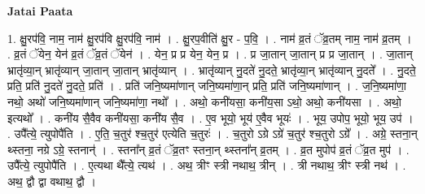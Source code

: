 \documentclass[17pt]{extarticle}
\begin{document}
\textbf{Jatai Paata} \newline

1. क्षु॒रप॑वि॒ नाम॒ नाम॑ क्षु॒रप॑वि क्षु॒रप॑वि॒ नाम॑ । . क्षु॒रप॒वीति॑ क्षु॒र - प॒वि॒ । . नाम॑ व्र॒तं ॅव्र॒तम् नाम॒ नाम॑ व्र॒तम् । . व्र॒तं ॅयेन॒ येन॑ व्र॒तं ॅव्र॒तं ॅयेन॑ । . येन॒ प्र प्र येन॒ येन॒ प्र । . प्र जा॒तान् जा॒तान् प्र प्र जा॒तान् । . जा॒तान् भ्रातृ॑व्या॒न् भ्रातृ॑व्यान् जा॒तान् जा॒तान् भ्रातृ॑व्यान् । . भ्रातृ॑व्यान् नु॒दते॑ नु॒दते॒ भ्रातृ॑व्या॒न् भ्रातृ॑व्यान् नु॒दते᳚ । . नु॒दते॒ प्रति॒ प्रति॑ नु॒दते॑ नु॒दते॒ प्रति॑ । . प्रति॑ जनि॒ष्यमा॑णान् जनि॒ष्यमा॑णा॒न् प्रति॒ प्रति॑ जनि॒ष्यमा॑णान् । . ज॒नि॒ष्यमा॑णा॒ नथो॒ अथो॑ जनि॒ष्यमा॑णान् जनि॒ष्यमा॑णा॒ नथो᳚ । . अथो॒ कनी॑यसा॒ कनी॑य॒सा ऽथो॒ अथो॒ कनी॑यसा । . अथो॒ इत्यथो᳚ । . कनी॑य सै॒वैव कनी॑यसा॒ कनी॑य सै॒व । . ए॒व भूयो॒ भूय॑ ए॒वैव भूयः॑ । . भूय॒ उपोप॒ भूयो॒ भूय॒ उप॑ । . उपै᳚त्ये॒ त्युपोपै॑ति । . ए॒ति॒ च॒तुर॑ श्च॒तुर॑ एत्येति च॒तुरः॑ । . च॒तुरो ऽग्रे ऽग्रे॑ च॒तुर॑ श्च॒तुरो ऽग्रे᳚ । . अग्रे॒ स्तना॒न् थ्स्तना॒ नग्रे ऽग्रे॒ स्तनान्॑ । . स्तना᳚न् व्र॒तं ॅव्र॒तꣳ स्तना॒न् थ्स्तना᳚न् व्र॒तम् । . व्र॒त मुपोप॑ व्र॒तं ॅव्र॒त मुप॑ । . उपै᳚त्ये॒ त्युपोपै॑ति । . ए॒त्यथा थै᳚त्ये॒ त्यथ॑ । . अथ॒ त्रीꣳ स्त्री नथाथ॒ त्रीन् । . त्री नथाथ॒ त्रीꣳ स्त्री नथ॑ । . अथ॒ द्वौ द्वा वथाथ॒ द्वौ । \newline
\end{document}
